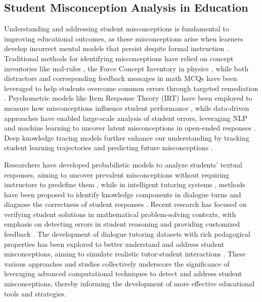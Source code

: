 \subsection{Student Misconception Analysis in Education}

Understanding and addressing student misconceptions is fundamental to improving educational outcomes, as these misconceptions arise when learners develop incorrect mental models that persist despite formal instruction \cite{chi1994conceptual}. Traditional methods for identifying misconceptions have relied on concept inventories like mal-rules \cite{malrules,sleeman}, the Force Concept Inventory in physics \cite{hestenes1992force}, while both distractors and corresponding feedback messages in math MCQs have been leveraged to help students overcome common errors through targeted remediation \cite{li2024automated,mcnichols2023automated}. Psychometric models like Item Response Theory (IRT) have been employed to measure how misconceptions influence student performance \cite{embretson2000item}, while data-driven approaches have enabled large-scale analysis of student errors, leveraging NLP and machine learning to uncover latent misconceptions in open-ended responses \cite{pardos2,pardos1}. Deep knowledge tracing models further enhance our understanding by tracking student learning trajectories and predicting future misconceptions \cite{pardos2013adapting,piech2015deep}.

Researchers have developed probabilistic models to analyze students' textual responses, aiming to uncover prevalent misconceptions without requiring instructors to predefine them \cite{michalenko2017data}, while in intelligent tutoring systems \cite{baker_test}, methods have been proposed to identify knowledge components in dialogue turns and diagnose the correctness of student responses \cite{scarlatos2023exploring}. Recent research has focused on verifying student solutions in mathematical problem-solving contexts, with emphasis on detecting errors in student reasoning and providing customized feedback \cite{daheim2024stepwise,liu2023novice}. The development of dialogue tutoring datasets with rich pedagogical properties has been explored to better understand and address student misconceptions, aiming to simulate realistic tutor-student interactions \cite{macina2023mathdial}. These various approaches and studies collectively underscore the significance of leveraging advanced computational techniques to detect and address student misconceptions, thereby informing the development of more effective educational tools and strategies.

